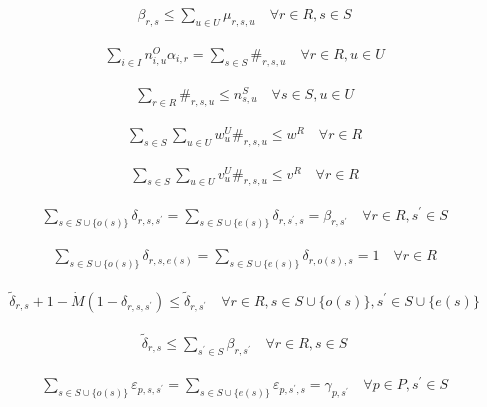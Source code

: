 \documentclass[10pt]{article}
\begin{document}
\[\begin{aligned}& \beta_{r, s} \le \sum_{u \in U} \mu_{r, s, u} \quad \forall r \in R, s \in S\end{aligned}\]

\[\begin{aligned}& \sum_{i \in I} n^O_{i, u} \alpha_{i, r} = \sum_{s \in S} \#_{r, s, u} \quad \forall r \in R, u \in U\end{aligned}\]

\[\begin{aligned}& \sum_{r \in R} \#_{r, s, u} \le n^S_{s, u} \quad \forall s \in S, u \in U\end{aligned}\]

\[\begin{aligned}& \sum_{s \in S} \sum_{u \in U} w^U_u \#_{r, s, u} \le w^R \quad \forall r \in R\end{aligned}\]

\[\begin{aligned}& \sum_{s \in S} \sum_{u \in U} v^U_u \#_{r, s, u} \le v^R \quad \forall r \in R\end{aligned}\]

\[\begin{aligned}& \sum_{s \in S \cup \{o(s)\}} \delta_{r, s, s^{\prime}} = \sum_{s \in S \cup \{e(s)\}} \delta_{r, s^{\prime}, s} = \beta_{r, s^{\prime}} \quad \forall r \in R, s^{\prime} \in S\end{aligned}\]

\[\begin{aligned}& \sum_{s \in S \cup \{o(s)\}} \delta_{r, s, e(s)} = \sum_{s \in S \cup \{e(s)\}} \delta_{r, o(s), s} = 1 \quad \forall r \in R\end{aligned}\]

\[\begin{aligned}& \tilde{\delta}_{r, s} + 1 - \dot{M}(1 - \delta_{r, s, s^{\prime}}) \le \tilde{\delta}_{r, s^{\prime}} \quad \forall r \in R, s \in S \cup \{o(s)\}, s^{\prime} \in S \cup \{e(s)\}\end{aligned}\]

\[\begin{aligned}& \tilde{\delta}_{r, s} \le \sum_{s^{\prime} \in S} \beta_{r, s^{\prime}} \quad \forall r \in R, s \in S\end{aligned}\]

\[\begin{aligned}& \sum_{s \in S \cup \{o(s)\}} \varepsilon_{p, s, s^{\prime}} = \sum_{s \in S \cup \{e(s)\}} \varepsilon_{p, s^{\prime}, s} = \gamma_{p, s^{\prime}} \quad \forall p \in P, s^{\prime} \in S\end{aligned}\]
\end{document}
